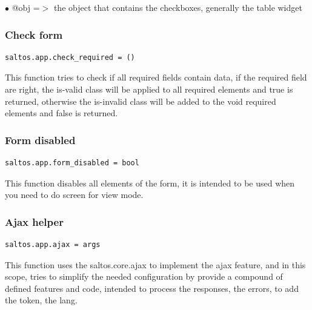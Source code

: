 \documentclass[a4paper]{article}
\begin{document}
\begin{compactitem}
\item[\color{myblue}$\bullet$] @obj =$>$ the object that contains the checkboxes, generally the table widget
\end{compactitem}

\hypertarget{toc17}{}
\subsubsection{Check form}

\begin{lstlisting}
saltos.app.check_required = ()
\end{lstlisting}

This function tries to check if all required fields contain data, if the required field are
right, the is-valid class will be applied to all required elements and true is returned,
otherwise the is-invalid class will be added to the void required elements and false is
returned.

\hypertarget{toc18}{}
\subsubsection{Form disabled}

\begin{lstlisting}
saltos.app.form_disabled = bool
\end{lstlisting}

This function disables all elements of the form, it is intended to be used when you need
to do screen for view mode.

\hypertarget{toc19}{}
\subsubsection{Ajax helper}

\begin{lstlisting}
saltos.app.ajax = args
\end{lstlisting}

This function uses the saltos.core.ajax to implement the ajax feature, and in
this scope, tries to simplify the needed configuration by provide a compound of
defined features and code, intended to process the responses, the errors, to
add the token, the lang.
\end{document}
